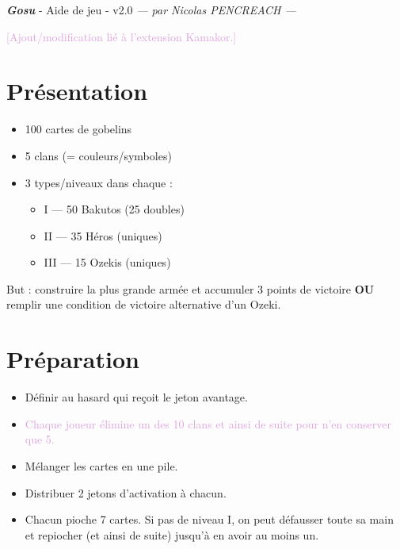 \documentclass[10pt, a4paper]{article}	%
\begin{document}
{\LARGE \textbf{\textit{Gosu}}}
{\large - Aide de jeu - v2.0}\textit{ — par Nicolas PENCREACH —}

\setlength{\columnseprule}{0.004cm}	%
\begin{multicols}{3}				%

\textcolor{Plum}{[Ajout/modification lié à l’extension Kamakor.]}

\section{Présentation}
\label{sec:presentation}

\begin{itemize}
	\item 100 cartes de gobelins
	\item 5 clans (= couleurs/symboles)
	\item 3 types/niveaux dans chaque :
	\begin{itemize}
		\item I   — 50 Bakutos (25 doubles)
		\item II  — 35 Héros (uniques)
		\item III — 15 Ozekis (uniques)
	\end{itemize}
\end{itemize}


But : construire la plus grande armée et accumuler 3 points de victoire \textbf{OU} remplir une condition de victoire alternative d’un Ozeki.


\section{Préparation}
\label{sec:preparation}

\begin{itemize}
	\item Définir au hasard qui reçoit le jeton avantage.
	\item \textcolor{Plum}{Chaque joueur élimine un des 10 clans et ainsi de suite pour n’en conserver que 5.}
	\item Mélanger les cartes en une pile.
	\item Distribuer 2 jetons d’activation à chacun.
	\item Chacun pioche 7 cartes. Si pas de niveau I, on peut défausser toute sa main et repiocher (et ainsi de suite) jusqu’à en avoir au moins un.
\end{itemize}



\end{multicols}
\end{document}
